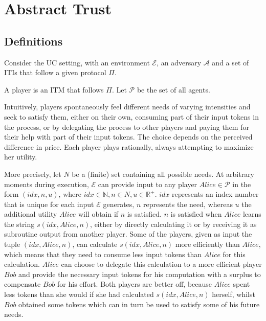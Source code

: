 \section*{Abstract Trust}
  \subsection{Definitions}
    Consider the UC setting, with an environment $\mathcal{E}$, an adversary $\mathcal{A}$ and a set of ITIs that follow a
    given protocol $\Pi$.

    \begin{definition}[Player]
      A player is an ITM that follows $\Pi$. Let $\mathcal{P}$ be the set of all agents.
    \end{definition}

    Intuitively, players spontaneously feel different needs of varying intensities and seek to satisfy them, either on their
    own, consuming part of their input tokens in the process, or by delegating the process to other players and paying them
    for their help with part of their input tokens. The choice depends on the perceived difference in price. Each player
    plays rationally, always attempting to maximize her utility.
    
    More precisely, let $N$ be a (finite) set containing all possible needs. At arbitrary moments during execution,
    $\mathcal{E}$ can provide input to any player $Alice \in \mathcal{P}$ in the form $\left(idx, n, u\right)$, where $idx
    \in \mathbb{N}, n \in N, u \in \mathbb{R}^{+}$. $idx$ represents an index number that is unique for each input
    $\mathcal{E}$ generates, $n$ represents the need, whereas $u$ the additional utility $Alice$ will obtain if $n$ is
    satisfied. $n$ is satisfied when $Alice$ learns the string $s\left(idx, Alice, n\right)$, either by directly calculating
    it or by receiving it as subroutine output from another player. Some of the players, given as input the tuple $\left(idx,
    Alice, n\right)$, can calculate $s\left(idx, Alice, n\right)$ more efficiently than $Alice$, which means that they need
    to consume less input tokens than $Alice$ for this calculation. $Alice$ can choose to delegate this calculation to a more
    efficient player $Bob$ and provide the necessary input tokens for his computation with a surplus to compensate $Bob$ for
    his effort. Both players are better off, because $Alice$ spent less tokens than she would if she had calculated
    $s\left(idx, Alice, n\right)$ herself, whilst $Bob$ obtained some tokens which can in turn be used to satisfy some of his
    future needs.

